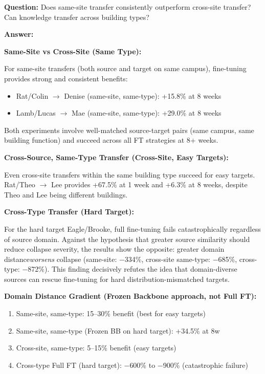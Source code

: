 \documentclass[12pt,a4paper]{report}
\begin{document}
\textbf{Question:} Does same-site transfer consistently outperform cross-site transfer? Can knowledge transfer across building types?

\textbf{Answer:}

\textbf{Same-Site vs Cross-Site (Same Type):}

For same-site transfers (both source and target on same campus), fine-tuning provides strong and consistent benefits:

\begin{itemize}
    \item Rat/Colin $\to$ Denise (same-site, same-type): +15.8\% at 8 weeks
    \item Lamb/Lucas $\to$ Mae (same-site, same-type): +29.0\% at 8 weeks
\end{itemize}

Both experiments involve well-matched source-target pairs (same campus, same building function) and succeed across all FT strategies at 8+ weeks.

\textbf{Cross-Source, Same-Type Transfer (Cross-Site, Easy Targets):}

Even cross-site transfers within the same building type succeed for easy targets. Rat/Theo $\to$ Lee provides +67.5\% at 1 week and +6.3\% at 8 weeks, despite Theo and Lee being different buildings.

\textbf{Cross-Type Transfer (Hard Target):}

For the hard target Eagle/Brooke, full fine-tuning fails catastrophically regardless of source domain. Against the hypothesis that greater source similarity should reduce collapse severity, the results show the opposite: greater domain distance\textit{worsens} collapse (same-site: $-$334\%, cross-site same-type: $-$685\%, cross-type: $-$872\%). This finding decisively refutes the idea that domain-diverse sources can rescue fine-tuning for hard distribution-mismatched targets.

\textbf{Domain Distance Gradient (Frozen Backbone approach, not Full FT):}
\begin{enumerate}
    \item Same-site, same-type: 15--30\% benefit (best for easy targets)
    \item Same-site, same-type (Frozen BB on hard target): +34.5\% at 8w
    \item Cross-site, same-type: 5--15\% benefit (easy targets)
    \item Cross-type Full FT (hard target): $-$600\% to $-$900\% (catastrophic failure)
\end{enumerate}
\end{document}
